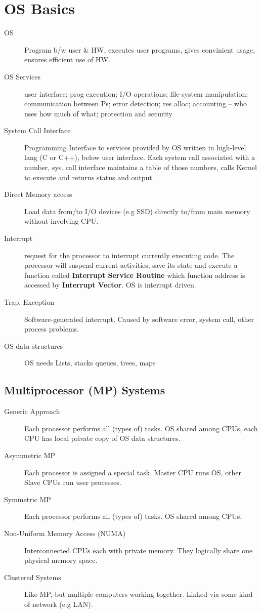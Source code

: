 \section*{OS Basics}
\begin{description}
  \item[OS] Program b/w user \& HW, executes user programs, gives convinient usage, ensures efficient use of HW. 
  \item[OS Services] user interface; prog execution; I/O operations; file-system manipulation; communication between Ps; error detection; res alloc; accounting – who uses how much of what; protection and security
    \item[System Call Interface] Programming Interface to services provided by OS written in high-level lang (C or C++), below user interface. Each system call associated with a number, sys. call interface maintains a table of those numbers, calls Kernel to execute and returns status and output.
  \item[Direct Memory access] Load data from/to I/O devices (e.g SSD) directly to/from main memory without involving CPU.
  \item[Interrupt] request for the processor to interrupt currently executing code. The processor will suspend current activities, save its state and execute a function called \textbf{Interrupt Service Routine} which function address is accessed by \textbf{Interrupt Vector}. OS is interrupt driven.
  \item[Trap, Exception] Software-generated interrupt. Caused by software error, system call, other process problems.
  \item[OS data structures] OS needs Lists, stacks queues, trees, maps
\end{description}

\subsection*{Multiprocessor (MP) Systems}
\begin{description}
  \item[Generic Approach] Each processor performs all (types of) tasks. OS shared among CPUs, each CPU has local private copy of OS data structures.
  \item[Asymmetric MP] Each processor is assigned a special task. Master CPU runs OS, other Slave CPUs run user processes.
  \item[Symmetric MP] Each processor performs all (types of) tasks. OS shared among CPUs.
  \item[Non-Uniform Memory Access (NUMA)] Interconnected CPUs each with private memory. They logically share one physical memory space.
  \item[Clustered Systems] Like MP, but multiple computers working together. Linked via some kind of network (e.g LAN).
\end{description} 

